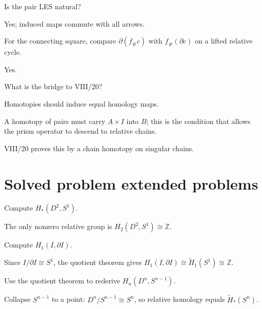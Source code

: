 \begin{exercise}\label{exr:viii19-23}
Is the pair LES natural?
\end{exercise}
\begin{hint}
Yes; induced maps commute with all arrows.

For the connecting square, compare \(\partial(f_\#c)\) with \(f_\#(\partial c)\) on a lifted relative cycle.
\end{hint}
\begin{solution}
Yes.
\end{solution}

\begin{exercise}\label{exr:viii19-24}
What is the bridge to VIII/20?
\end{exercise}
\begin{hint}
Homotopies should induce equal homology maps.

A homotopy of pairs must carry \(A\times I\) into \(B\); this is the condition that allows the prism operator to descend to relative chains.
\end{hint}
\begin{solution}
VIII/20 proves this by a chain homotopy on singular chains.
\end{solution}


\section{Solved problem extended problems}

\begin{problem}\label{prob:viii19-01}
Compute \(H_*(D^2,S^1)\).
\end{problem}
\begin{solution}
The only nonzero relative group is \(H_2(D^2,S^1)\cong\mathbb Z\).
\end{solution}

\begin{problem}\label{prob:viii19-02}
Compute \(H_1(I,\partial I)\).
\end{problem}
\begin{solution}
Since \(I/\partial I\cong S^1\), the quotient theorem gives \(H_1(I,\partial I)\cong\widetilde H_1(S^1)\cong\mathbb Z\).
\end{solution}

\begin{problem}\label{prob:viii19-03}
Use the quotient theorem to rederive \(H_n(D^n,S^{n-1})\).
\end{problem}
\begin{solution}
Collapse \(S^{n-1}\) to a point: \(D^n/S^{n-1}\cong S^n\), so relative homology equals \(\widetilde H_*(S^n)\).
\end{solution}

